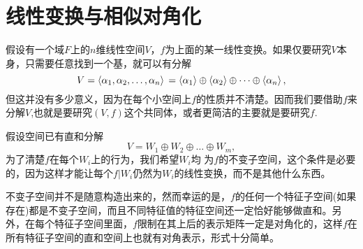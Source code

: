 \section{线性变换与相似对角化}
假设有一个域$F$上的$n$维线性空间$V$，$f$为上面的某一线性变换。如果仅要研究$V$本身，只需要任意找到一个基，就可以有分解
\[
    V=\left\langle \alpha_1,\alpha_2,\dots,\alpha_n\right\rangle\\
    =\left\langle \alpha_1\right\rangle \oplus \left\langle \alpha_2\right\rangle
    \oplus \dots \oplus \left\langle \alpha_n\right\rangle,
\]
但这并没有多少意义，因为在每个小空间上$f$的性质并不清楚。因而我们要借助$f$来分解$V$,也就是要研究$(V,f)$这个共同体，或者更简洁的主要就是要研究$f$.

假设空间已有直和分解
\[V=W_1\oplus W_2\oplus\dots\oplus W_m,\]
为了清楚$f$在每个$W_i$上的行为，我们希望$W_i$均	为$f$的不变子空间，这个条件是必要的，因为这样才能让每个$f|W_i$仍然为$W_i$的线性变换，而不是其他什么东西。

不变子空间并不是随意构造出来的，然而幸运的是，$f$的任何一个特征子空间(如果存在)都是不变子空间，而且不同特征值的特征空间还一定恰好能够做直和。另外，在每个特征子空间里面，$f$限制在其上后的表示矩阵一定是对角化的，这样$f$在所有特征子空间的直和空间上也就有对角表示，形式十分简单。

